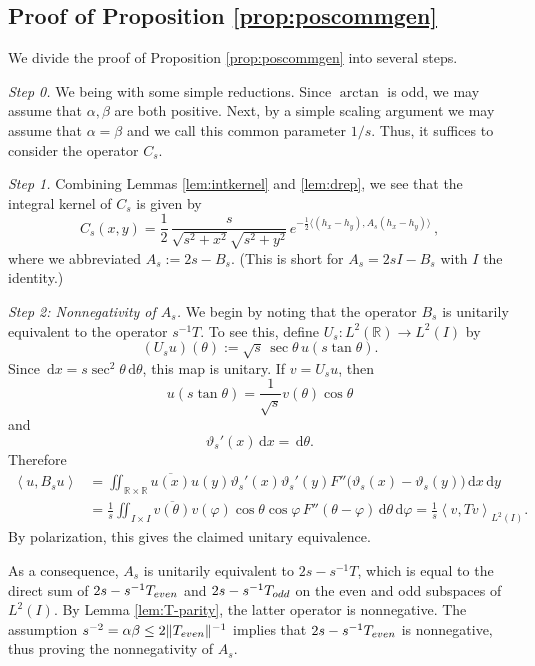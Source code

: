 \documentclass[10pt,a4paper]{amsart}
\newcommand{\R}{\mathbb{R}}
\newcommand{\ip}[2]{\left\langle #1,#2\right\rangle}
\newcommand{\dd}{\,\mathrm{d}}
\begin{document}

\subsection*{Proof of Proposition \ref{prop:poscommgen}}

We divide the proof of Proposition \ref{prop:poscommgen} into several steps.

\medskip

\emph{Step 0.} We being with some simple reductions. Since $\arctan$ is odd, we may assume that $\alpha,\beta$ are both positive. Next, by a simple scaling argument we may assume that $\alpha=\beta$ and we call this common parameter $1/s$. Thus, it suffices to consider the operator $C_s$.

\medskip

\emph{Step 1.} Combining Lemmas \ref{lem:intkernel} and \ref{lem:drep}, we see that the integral kernel of $C_s$ is given by
    \begin{equation}
        \label{eq:posommgenproof}
            C_s(x,y) = \frac12 \, \frac{s}{\sqrt{s^2+x^2}\sqrt{s^2+y^2}} \, e^{-\frac12 \langle (h_x-h_y),A_s(h_x-h_y)\rangle} \,,
    \end{equation}
    where we abbreviated $A_s:=2s-B_s$. (This is short for $A_s=2sI-B_s$ with $I$ the identity.)

\medskip

\emph{Step 2: Nonnegativity of $A_s$.}
    We begin by noting that the operator $B_s$ is unitarily equivalent to the operator $s^{-1} T$. To see this, define $U_s:L^2(\R)\to L^2(I)$ by
\begin{equation}\label{eq:Us-def}
(U_su)(\theta):=\sqrt{s}\,\sec\theta\,u(s\tan\theta).
\end{equation}
Since $\dd x=s\sec^2\theta\dd\theta$, this map is unitary.  If $v=U_su$, then
\[
u(s\tan\theta)=\frac{1}{\sqrt{s}}v(\theta)\cos\theta
\]
and
\[
\vartheta_s'(x)\dd x=\dd\theta.
\]
Therefore
\begin{align*}
    \ip{u}{B_su} & = \iint_{\R\times\R}\overline{u(x)}u(y)
\vartheta_s'(x)\vartheta_s'(y)
F''\bigl(\vartheta_s(x)-\vartheta_s(y)\bigr)
\dd x\dd y \\
& = \frac1s \iint_{I\times I} \overline{v(\theta)}v(\varphi) \cos\theta\cos\varphi\,F''(\theta-\varphi) \dd\theta \dd\varphi
= \frac1s\ip{v}{Tv}_{L^2(I)}.
\end{align*}
By polarization, this gives the claimed unitary equivalence.

As a consequence, $A_s$ is unitarily equivalent to $2s - s^{-1}T$, which is equal to the direct sum of $2s-s^{-1}T_{\rm even}$ and $2s-s^{-1} T_{\rm odd}$ on the even and odd subspaces of $L^2(I)$. By Lemma \ref{lem:T-parity}, the latter operator is nonnegative. The assumption $s^{-2} = \alpha\beta\leq 2\|T_{\rm even}\|^{-1}$ implies that $2s-s^{-1}T_{\rm even}$ is nonnegative, thus proving the nonnegativity of $A_s$.
\end{document}
